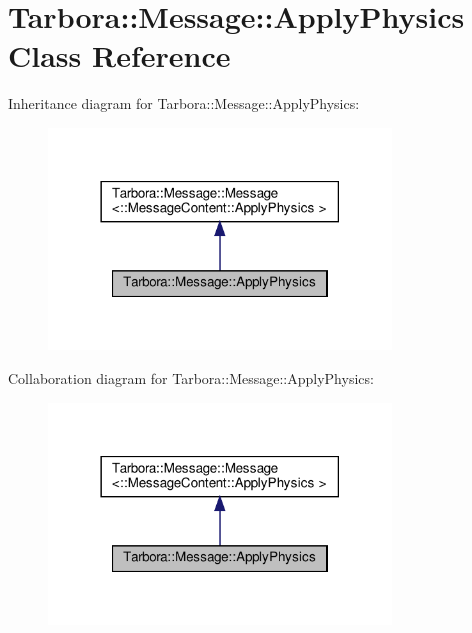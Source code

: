 \hypertarget{classTarbora_1_1Message_1_1ApplyPhysics}{}\section{Tarbora\+:\+:Message\+:\+:Apply\+Physics Class Reference}
\label{classTarbora_1_1Message_1_1ApplyPhysics}


Inheritance diagram for Tarbora\+:\+:Message\+:\+:Apply\+Physics\+:\nopagebreak
\begin{figure}[H]
\begin{center}
\leavevmode
\includegraphics[width=258pt]{classTarbora_1_1Message_1_1ApplyPhysics__inherit__graph}
\end{center}
\end{figure}


Collaboration diagram for Tarbora\+:\+:Message\+:\+:Apply\+Physics\+:\nopagebreak
\begin{figure}[H]
\begin{center}
\leavevmode
\includegraphics[width=258pt]{classTarbora_1_1Message_1_1ApplyPhysics__coll__graph}
\end{center}
\end{figure}
